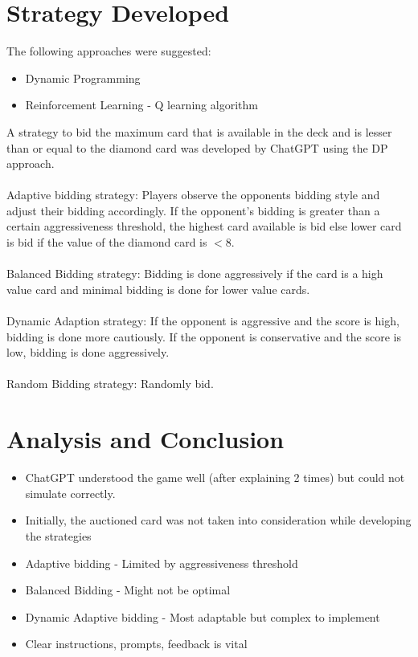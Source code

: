 \documentclass{article}
\begin{document}
\section{Strategy Developed}
\begin{text}
\begin{large}
The following approaches were suggested: 
\begin{itemize}
\item Dynamic Programming
\item Reinforcement Learning - Q learning algorithm
\end{itemize}
A strategy to bid the maximum card that is available in the deck and is lesser than or equal to the diamond card was developed by ChatGPT using the DP approach. \\ \\
Adaptive bidding strategy: Players observe the opponents bidding style and adjust their bidding accordingly. If the opponent's bidding is greater than a certain aggressiveness threshold, the highest card available is bid else lower card is bid if the value of the diamond card is $<$8. \\ \\ 
Balanced Bidding strategy: Bidding is done aggressively if the card is a high value card and minimal bidding is done for lower value cards. \\ \\
Dynamic Adaption strategy: If the opponent is aggressive and the score is high, bidding is done more cautiously. If the opponent is conservative and the score is low, bidding is done aggressively. \\ \\ 
Random Bidding strategy: Randomly bid.
\end{large}
\end{text}

\vspace{12pt}

\section{Analysis and Conclusion}
\begin{large}
\begin{itemize}
    \item ChatGPT understood the game well (after explaining 2 times) but could not simulate correctly.
    \item Initially, the auctioned card was not taken into consideration while developing the strategies
    \item Adaptive bidding - Limited by aggressiveness threshold
    \item Balanced Bidding - Might not be optimal
    \item Dynamic Adaptive bidding - Most adaptable but complex to implement
    \item Clear instructions, prompts, feedback is vital
\end{itemize}
\end{large}
\vspace{12pt}
\end{document}
